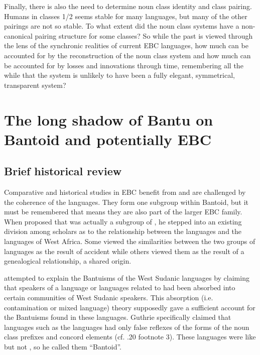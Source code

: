 \documentclass[output=paper]{langsci/langscibook}
\begin{document}
Finally, there is also the need to determine noun class identity and class pairing. Humans in classes 1/2 seems stable for many languages, but many of the other pairings are not so stable. To what extent did the  noun class systems have a non-canonical pairing structure for some classes? So while the past is viewed through the lens of the synchronic realities of current EBC languages, how much can be accounted for by the reconstruction of the  noun class system and how much can be accounted for by losses and innovations through time, remembering all the while that the  system is unlikely to have been a fully elegant, symmetrical, transparent system? 


\section{The long shadow of Bantu on Bantoid and potentially EBC}\label{sec:watters:7}
\subsection{Brief historical review}


Comparative and historical studies in EBC benefit from and are challenged by the coherence of the  languages. They form one subgroup within Bantoid, but it must be remembered that means they are also part of the larger EBC family. When \citet{Greenberg1963} proposed that  was actually a subgroup of , he stepped into an existing division among scholars as to the relationship between the  languages and the languages of West Africa. Some viewed the similarities between the two groups of languages as the result of accident while others viewed them as the result of a genealogical relationship, a shared origin.

\citet{Guthrie1962} attempted to explain the {\textquotedbl}Bantuisms{\textquotedbl} of the West Sudanic languages by claiming that speakers of a language or languages related to  had been absorbed into certain communities of West Sudanic speakers.  This absorption (i.e. {\textquotedbl}contamination{\textquotedbl} or {\textquotedbl}mixed language{\textquotedbl}) theory supposedly gave a sufficient account for the Bantuisms found in these languages.  Guthrie specifically claimed that languages such as the  languages had only false reflexes of the  forms of the noun class prefixes and concord elements (cf. \citealt{Guthrie1962}.20 footnote 3). These languages were like  but not , so he called them “Bantoid”. 
\end{document}
